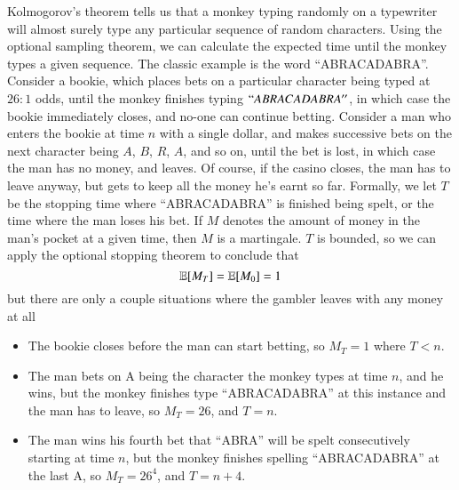 \begin{example}
    Kolmogorov's theorem tells us that a monkey typing randomly on a typewriter will almost surely type any particular sequence of random characters. Using the optional sampling theorem, we can calculate the expected time until the monkey types a given sequence. The classic example is the word ``ABRACADABRA''. Consider a bookie, which places bets on a particular character being typed at $26:1$ odds, until the monkey finishes typing $``ABRACADABRA''$, in which case the bookie immediately closes, and no-one can continue betting. Consider a man who enters the bookie at time $n$ with a single dollar, and makes successive bets on the next character being $A$, $B$, $R$, $A$, and so on, until the bet is lost, in which case the man has no money, and leaves. Of course, if the casino closes, the man has to leave anyway, but gets to keep all the money he's earnt so far. Formally, we let $T$ be the stopping time where ``ABRACADABRA'' is finished being spelt, or the time where the man loses his bet. If $M$ denotes the amount of money in the man's pocket at a given time, then $M$ is a martingale. $T$ is bounded, so we can apply the optional stopping theorem to conclude that
    \[ \operatorname{\mathbb{E}}[M_T] = \operatorname{\mathbb{E}}[M_0] = 1 \]
    but there are only a couple situations where the gambler leaves with any money at all
    \begin{itemize}
        \item The bookie closes before the man can start betting, so $M_T = 1$ where $T < n$.

        \item The man bets on A being the character the monkey types at time $n$, and he wins, but the monkey finishes type ``ABRACADABRA'' at this instance and the man has to leave, so $M_T = 26$, and $T = n$.

        \item The man wins his fourth bet that ``ABRA'' will be spelt consecutively starting at time $n$, but the monkey finishes spelling ``ABRACADABRA'' at the last A, so $M_T = 26^4$, and $T = n+4$.


\end{itemize}
\end{example}
